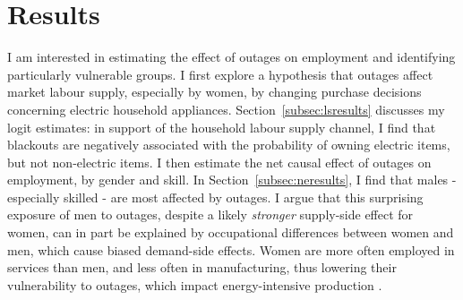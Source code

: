 \documentclass[12pt]{article}
\begin{document}
\section{Results} \label{sec:results}
I am interested in estimating the effect of outages on employment and identifying particularly vulnerable groups. I first explore a hypothesis that outages affect market labour supply, especially by women, by changing purchase decisions concerning electric household appliances. Section~\ref{subsec:lsresults} discusses my logit estimates: in support of the household labour supply channel, I find that blackouts are negatively associated with the probability of owning electric items, but not non-electric items. I then estimate the net causal effect of outages on employment, by gender and skill. In Section~\ref{subsec:neresults}, I find that males - especially skilled - are most affected by outages. I argue that this surprising exposure of men to outages, despite a likely \textit{stronger} supply-side effect for women, can in part be explained by occupational differences between women and men, which cause biased demand-side effects. Women are more often employed in services than men, and less often in manufacturing, thus lowering their vulnerability to outages, which impact energy-intensive production \cite{alam2013a}.
\end{document}
